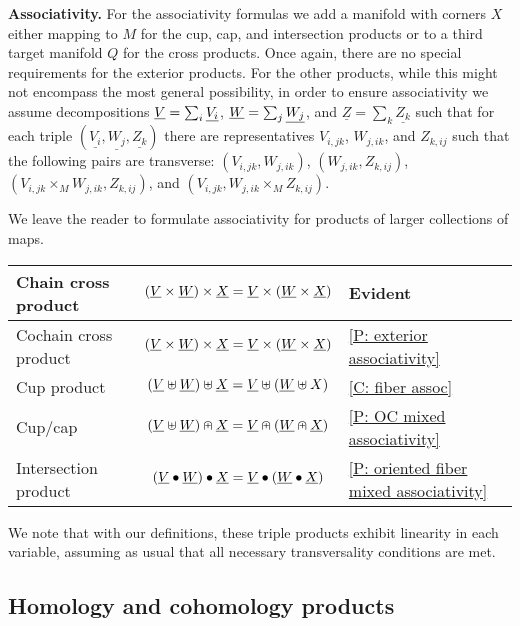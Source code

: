 \bigskip

\textbf{Associativity.}
For the associativity formulas we add a manifold with corners $X$ either mapping to $M$ for the cup, cap, and intersection products or to a third target manifold $Q$ for the cross products. Once again, there are no special requirements for the exterior products. For the other products, while this might not encompass the most general possibility, in order to ensure associativity we assume decompositions $\underline{V}=\sum_i \underline{V_i}$, $\underline{W}=\sum_j \underline{W_j}$, and $\underline{Z}=\sum_k \underline{Z_k}$ such that for each triple $(\underline{V_i},\underline{W_j}, \underline{Z_k})$ there are representatives $V_{i,jk}$, $W_{j,ik}$, and $Z_{k,ij}$ such that the following pairs are transverse: $(V_{i,jk}, W_{j,ik})$, $(W_{j,ik},Z_{k,ij})$, $(V_{i,jk}\times_M W_{j,ik},Z_{k,ij})$, and $(V_{i,jk}, W_{j,ik}\times_M Z_{k,ij})$.

We leave the reader to formulate associativity for products of larger collections of maps.


\bigskip

\begin{minipage}{\linewidth}
\centering





\begin{tabular}{|l|c|l|}
\hline
Chain cross product& $(\underline{V}\times \underline{W})\times \underline{X}=\underline{V}\times (\underline{W}\times \underline{X})$&Evident\\
\hline
Cochain cross product& $(\underline{V}\times \underline{W})\times \underline{X}=\underline{V}\times (\underline{W}\times \underline{X})$&\cref{P: exterior associativity}\\
\hline
Cup product &$(\underline{V}\uplus \underline{W})\uplus\underline{X}=\underline{V}\uplus(\underline{W}\uplus X)$&\cref{C: fiber assoc} \\
\hline
Cup/cap & $(\underline{V} \uplus \underline{W})\nplus \underline{X}=\underline{V}\nplus(\underline{W}\nplus\underline{X})$& \cref{P: OC mixed associativity}\\
\hline
Intersection product &
$(\underline{V}\bullet\underline{W})\bullet\underline{X}=\underline{V}\bullet(\underline{W}\bullet \underline{X})$&\cref{P: oriented fiber mixed associativity}\\
\hline
\end{tabular}
\end{minipage}

\bigskip

We note that with our definitions, these triple products exhibit linearity in each variable, assuming as usual that all necessary transversality conditions are met.



\subsection{Homology and cohomology products}\label{S: homology products}

